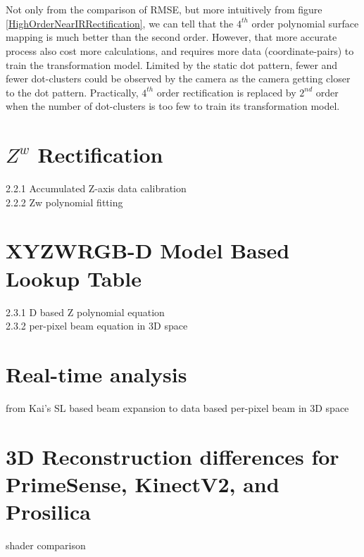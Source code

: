 \\\\%
Not only from the comparison of RMSE, but more intuitively from figure \ref{HighOrderNearIRRectification}, we can tell that the \(4^{th}\) order polynomial surface mapping is much better than the second order. However, that more accurate process also cost more calculations, and requires more data (coordinate-pairs) to train the transformation model. Limited by the static dot pattern, fewer and fewer dot-clusters could be observed by the camera as the camera getting closer to the dot pattern. Practically, \(4^{th}\) order rectification is replaced by  \(2^{nd}\) order when the number of dot-clusters is too few to train its transformation model.
%
%
%
\section{\(Z^{w}\) Rectification}

2.2.1 Accumulated Z-axis data calibration\\
2.2.2 Zw polynomial fitting



\section{XYZWRGB-D Model Based Lookup Table}
2.3.1  D based Z polynomial equation\\
2.3.2 per-pixel beam equation in 3D space



\section{Real-time analysis}
from Kai's SL based beam expansion to data based per-pixel beam in 3D space

\section{3D Reconstruction differences for PrimeSense, KinectV2, and Prosilica}
shader comparison
%
%
%
%
%
%
%
































